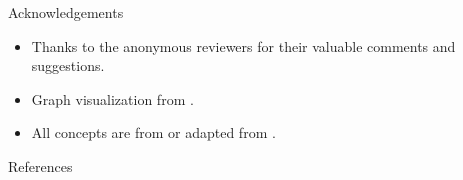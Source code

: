 \documentclass{beamer}
\begin{document}
\begin{frame}{Acknowledgements}
  \begin{itemize}
    \item Thanks to the anonymous reviewers for their valuable comments and suggestions.
    \item Graph visualization from \cite{overbeek2023apbpotutorial}.
    \item All concepts are from or adapted from \cite{endrullis2024generalized_arxiv_v2}.
  \end{itemize}
\end{frame}

\begin{frame}[allowframebreaks]{References}
    \printbibliography[heading=none]
\end{frame}
\end{document}
